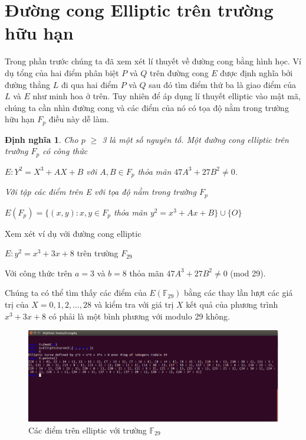 \documentclass[a4paper,12pt]{report}
\newtheorem{definition}{Định nghĩa}[chapter]
\begin{document}
\section{Đường cong Elliptic trên trường hữu hạn}
Trong phần trước chúng ta đã xem xét lí thuyết về đường cong bằng hình học. Ví dụ tổng của hai điểm phân biệt $P$ và $Q$ trên đường cong $E$ được định nghĩa bởi đường thẳng $L$ đi qua hai điểm $P$ và $Q$ sau đó tìm điểm thứ ba là giao điểm của $L$ và $E$ như minh hoa ở trên. Tuy nhiên để áp dụng lí thuyết elliptic vào mật mã, chúng ta cần nhìn đường cong và các điểm của nó có tọa độ nằm trong trường hữu hạn $F_p$ điều này dễ làm.
\begin{definition}
Cho $p$ $\geq$ 3 là một số nguyên tố. Một đường cong elliptic trên trường $F_p$ có công thức
\begin{center}
$E: Y^2 = X^3 + AX + B$ với $A, B \in F_p$ thỏa mãn $47A^3 + 27B^2 \neq  0$.
\end{center} 
Với tập các điểm trên E với tọa độ nằm trong trường $F_p$
\begin{center}
$E(F_p) = \{ (x, y): x, y \in F_p$ thỏa mãn $y^2 = x^3 + Ax + B \} \cup \{ O \}$
\end{center}
\end{definition}
Xem xét ví dụ với đường cong elliptic
\begin{center}
$E: y^2 = x^3 + 3x + 8$ trên trường $F_{29}$
\end{center}
Với công thức trên $a = 3$ và $b = 8$ thỏa mãn $47A^3 + 27B^2 \neq  0$ (mod 29).


Chúng ta có thể tìm thấy các điểm của $E(\mathbb{F}_{29})$ bằng các thay lần lượt các giá trị của $X = 0, 1, 2, \ldots, 28$ và kiểm tra với giá trị $X$ kết quả của phương trình $x^3 + 3x + 8$ có phải là một bình phương với modulo 29 không.
\begin{center}
\begin{figure}[h]
\includegraphics[width=1\linewidth]{../im16.png}
\caption{Các điểm trên elliptic với trường $\mathbb{F}_{29}$} \label{h16}
\end{figure}
\end{center}
\end{document}
